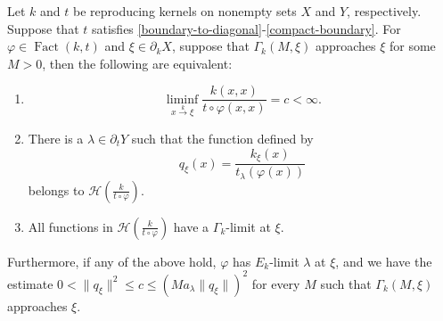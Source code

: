 \documentclass[10pt,a4paper]{amsart}
\DeclareMathOperator{\Fact}{Fact}
\newcommand{\Hilbert}{\mathcal{H}}
\newcommand{\rand}{\partial}
\newcommand{\xto}[1]{\stackrel{#1}{\to}}
\renewcommand{\phi}{\varphi}
\begin{document}
\begin{theorem}\label{theorem:main}
Let $k$ and $t$ be reproducing kernels on nonempty sets $X$ and $Y$, respectively.
Suppose that $t$ satisfies \ref{boundary-to-diagonal}-\ref{compact-boundary}.
For $\phi\in\Fact(k,t)$ and $\xi\in\rand_kX$, suppose that $\Gamma_k(M,\xi)$
approaches $\xi$ for some $M>0$, then the following are equivalent:
\begin{enumerate}[label=(\roman*)]
\item\label{item:liminf-condition} \[
	\liminf_{x\xto{k}\xi}\frac{k(x,x)}{t\circ\phi(x,x)} = c < \infty.
\]
\item\label{item:kernel-quotient}
There is a $\lambda\in\rand_tY$ such that the function defined by \[
	q_\xi(x) = \frac{k_\xi(x)}{t_\lambda(\phi(x))}
\]
belongs to $\Hilbert(\frac{k}{t\circ\phi})$.
\item\label{item:uniform-boundary-values}
All functions in $\Hilbert(\frac{k}{t\circ\phi})$ have a $\Gamma_k$-limit at $\xi$.
\end{enumerate}
Furthermore, if any of the above hold, $\phi$ has $E_k$-limit $\lambda$ at $\xi$,
and we have the estimate $0<\|q_\xi\|^2\leq c \leq (Ma_\lambda\|q_\xi\|)^2$ for
every $M$ such that $\Gamma_k(M,\xi)$ approaches $\xi$.
\end{theorem}
\end{document}

